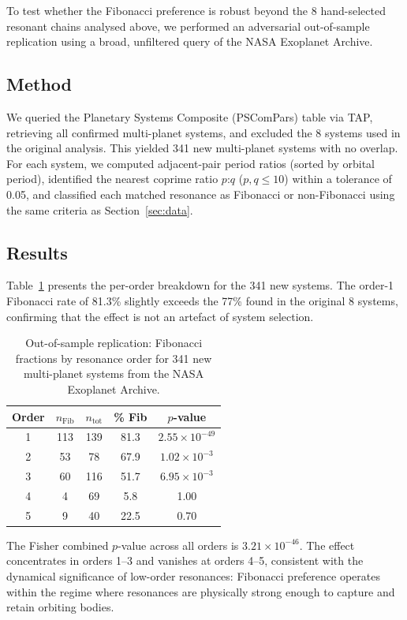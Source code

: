 \documentclass[twocolumn,11pt]{article}
\begin{document}
To test whether the Fibonacci preference is robust beyond the 8
hand-selected resonant chains analysed above, we performed an
adversarial out-of-sample replication using a broad, unfiltered query
of the NASA Exoplanet Archive.

\subsection{Method}

We queried the Planetary Systems Composite (PSComPars) table via TAP,
retrieving all confirmed multi-planet systems, and excluded the 8
systems used in the original analysis.  This yielded 341 new
multi-planet systems with no overlap.  For each system, we computed
adjacent-pair period ratios (sorted by orbital period), identified the
nearest coprime ratio $p$:$q$ ($p,q \leq 10$) within a tolerance of
0.05, and classified each matched resonance as Fibonacci or
non-Fibonacci using the same criteria as Section~\ref{sec:data}.

\subsection{Results}

Table~\ref{tab:replication} presents the per-order breakdown for the
341 new systems.  The order-1 Fibonacci rate of 81.3\% slightly
exceeds the 77\% found in the original 8 systems, confirming that the
effect is not an artefact of system selection.

\begin{table}[h]
\centering
\caption{Out-of-sample replication: Fibonacci fractions by resonance
order for 341 new multi-planet systems from the NASA Exoplanet Archive.}
\label{tab:replication}
\begin{tabular}{ccccc}
\toprule
Order & $n_\mathrm{Fib}$ & $n_\mathrm{tot}$ & \% Fib & $p$-value \\
\midrule
1 & 113 & 139 & 81.3 & $2.55 \times 10^{-49}$ \\
2 & 53 & 78 & 67.9 & $1.02 \times 10^{-3}$ \\
3 & 60 & 116 & 51.7 & $6.95 \times 10^{-3}$ \\
4 & 4 & 69 & 5.8 & 1.00 \\
5 & 9 & 40 & 22.5 & 0.70 \\
\bottomrule
\end{tabular}
\end{table}

The Fisher combined $p$-value across all orders is $3.21 \times
10^{-46}$.  The effect concentrates in orders 1--3 and vanishes at
orders 4--5, consistent with the dynamical significance of low-order
resonances: Fibonacci preference operates within the regime where
resonances are physically strong enough to capture and retain orbiting
bodies.
\end{document}
